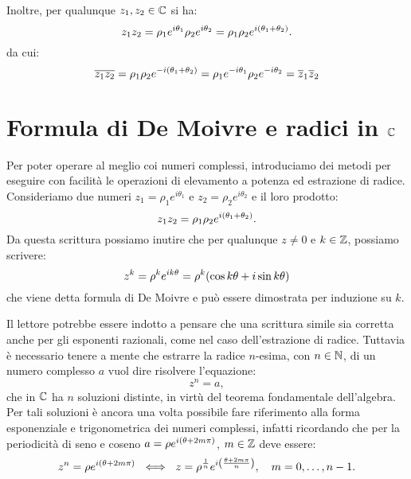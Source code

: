         Inoltre, per qualunque $z_1,z_2\in\mathbb{C}$ si ha:
            $$z_1z_2=\rho_1e^{i\theta_1}\rho_2e^{i\theta_2}=\rho_1\rho_2e^{i\qty(\theta_1+\theta_2)}.$$
        da cui:
        \begin{equation}
            \overline{z_1z_2}=\rho_1\rho_2e^{-i\qty(\theta_1+\theta_2)}=\rho_1e^{-i\theta_1}\rho_2e^{-i\theta_2}=\overline{z}_1\overline{z}_2
            \label{eq:prodottoconiugati}
        \end{equation}
    \section{Formula di De Moivre e radici in $\mathbb{C}$}
        Per poter operare al meglio coi numeri complessi, introduciamo dei metodi per eseguire con facilit\`a le operazioni di elevamento a potenza ed estrazione di radice. Consideriamo due numeri $z_1=\rho_1e^{i\theta_1}$ e $z_2=\rho_2e^{i\theta_2}$ e il loro prodotto:
            $$z_1z_2=\rho_1\rho_2e^{i\qty(\theta_1+\theta_2)}.$$
        Da questa scrittura possiamo inutire che per qualunque $z\neq 0$ e $k\in\mathbb{Z}$, possiamo scrivere:
        \begin{equation}
            z^k=\rho^ke^{ik\theta}=\rho^k\qty(\cos k\theta+i\sin k\theta)
            \label{eq:demoivre}
        \end{equation}
        che viene detta formula di De Moivre e pu\`o essere dimostrata per induzione su $k$.
        \par Il lettore potrebbe essere indotto a pensare che una scrittura simile sia corretta anche per gli esponenti razionali, come nel caso dell'estrazione di radice. Tuttavia \`e necessario tenere a mente che estrarre la radice $n$-esima, con $n\in\mathbb{N}$, di un numero complesso $a$ vuol dire risolvere l'equazione:
            $$z^n=a,$$
        che in $\mathbb{C}$ ha $n$ soluzioni distinte, in virt\`u del teorema fondamentale dell'algebra. Per tali soluzioni \`e ancora una volta possibile fare riferimento alla forma esponenziale e trigonometrica dei numeri complessi, infatti ricordando che per la periodicit\`a di seno e coseno $a=\rho e^{i\qty(\theta+2m\pi)}$, $m\in\mathbb{Z}$ deve essere:
            $$z^n=\rho\myexp{i\qty(\theta+2m\pi)}\ \iff\ z=\rho^{\frac{1}{n}}\myexp{i\qty(\frac{\theta+2m\pi}{n})},\quad m=0,\dots,n-1.$$